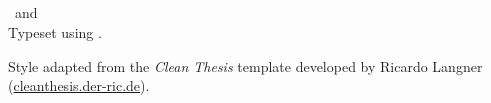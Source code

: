 {\tgherosfont \textbf{\thesisUniversity}} \\
\thesisUniversityDepartment \\
\thesisUniversityInstitute \\
\thesisUniversityStreetAddress \\
\thesisUniversityPostalCode\ and \thesisUniversityCity \\[1.5em]

Typeset using \LaTeXe.

Style adapted from the \textit{Clean Thesis} template developed by Ricardo Langner \\(\url{cleanthesis.der-ric.de}).
